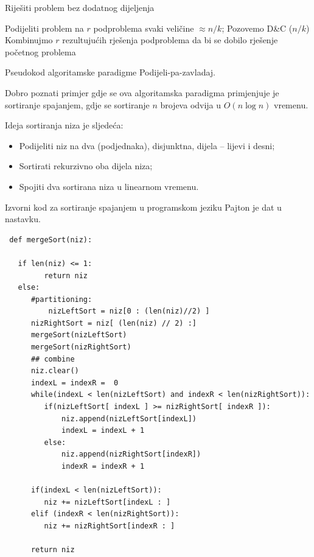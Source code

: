 \begin{algorithm}
	
\begin{algorithmic}[1]
 
  \State Riješiti problem bez dodatnog dijeljenja 
  \Else
 
   \State Podijeliti problem na $r$ podproblema svaki veličine $\approx n/k$;
        \State Pozovemo D\&C ($n/k$)
     \EndFor
   \State Kombinujmo $r$ rezultujućih rješenja podproblema da bi se dobilo rješenje početnog problema
\EndIf
\EndProcedure
\end{algorithmic}

\caption{Pseudokod algoritamske paradigme Podijeli-pa-zavladaj.}\label{alg:d-n-c}
\end{algorithm}
Dobro poznati primjer gdje se ova algoritamska paradigma primjenjuje je sortiranje spajanjem, gdje se sortiranje $n$ brojeva odvija u $O(n \log n)$ vremenu. 

Ideja sortiranja niza je sljedeća:
\begin{itemize}
	\item  Podijeliti niz na dva (podjednaka), disjunktna, dijela -- lijevi i desni;
    \item Sortirati rekurzivno oba dijela niza;
    \item Spojiti dva sortirana niza u linearnom vremenu.
\end{itemize}

Izvorni kod za sortiranje spajanjem u programskom jeziku Pajton je dat u nastavku.
\begin{verbatim}
 def mergeSort(niz):  

   if len(niz) <= 1:    
         return niz
   else:
      #partitioning:
          nizLeftSort = niz[0 : (len(niz)//2) ]
	  nizRightSort = niz[ (len(niz) // 2) :] 
	  mergeSort(nizLeftSort) 
	  mergeSort(nizRightSort)
	  ## combine
	  niz.clear()
	  indexL = indexR =  0
	  while(indexL < len(nizLeftSort) and indexR < len(nizRightSort)):
	 	 if(nizLeftSort[ indexL ] >= nizRightSort[ indexR ]):
	 		 niz.append(nizLeftSort[indexL])
	 		 indexL = indexL + 1
	 	 else:
	 		 niz.append(nizRightSort[indexR])
	 		 indexR = indexR + 1
	 
	  if(indexL < len(nizLeftSort)):
	 	 niz += nizLeftSort[indexL : ] 
	  elif (indexR < len(nizRightSort)):
	 	 niz += nizRightSort[indexR : ]
	 
	  return niz

\end{verbatim}

